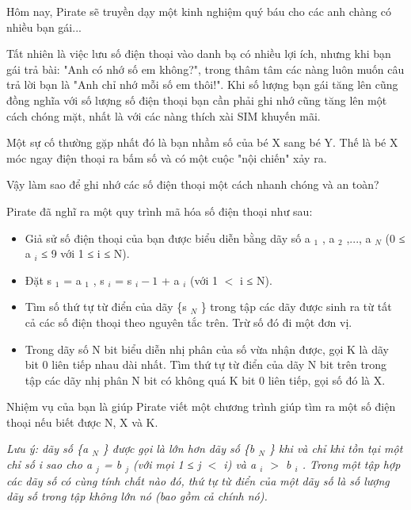



   Hôm nay, Pirate sẽ truyền dạy một kinh nghiệm quý báu cho các anh chàng có nhiều bạn gái...  

   Tất nhiên là việc lưu số điện thoại vào danh bạ có nhiều lợi ích, nhưng khi bạn gái trả bài: "Anh có nhớ số em không?", trong thâm tâm các nàng luôn muốn câu trả lời bạn là "Anh chỉ nhớ mỗi số em thôi!". Khi số lượng bạn gái tăng lên cũng đồng nghĩa với số lượng số điện thoại bạn cần phải ghi nhớ cũng tăng lên một cách chóng mặt, nhất là với các nàng thích xài SIM khuyến mãi.  

   Một sự cố thường gặp nhất đó là bạn nhầm số của bé X sang bé Y. Thế là bé X móc ngay điện thoại ra bấm số và có một cuộc "nội chiến" xảy ra.  

    Vậy làm sao để ghi nhớ các số điện thoại một cách nhanh chóng và an toàn?   

   Pirate đã nghĩ ra một quy trình mã hóa số điện thoại như sau:  
\begin{itemize}
	\item     Giả sử số điện thoại của bạn được biểu diễn bằng dãy số a    $_     1    $    , a    $_     2    $    ,..., a    $_     N    $    (0 ≤ a    $_     i    $    ≤ 9 với 1 ≤ i ≤ N).   
	\item     Đặt s    $_     1    $    = a    $_     1    $    , s    $_     i    $    = s    $_     i - 1    $    + a    $_     i    $    (với 1 $<$ i ≤ N).   
	\item     Tìm số thứ tự từ điển của dãy \{s    $_     N    $    \} trong tập các dãy được sinh ra từ tất cả các số điện thoại theo nguyên tắc trên. Trừ số đó đi một đơn vị.   
	\item     Trong dãy số N bit biểu diễn nhị phân của số vừa nhận được, gọi K là dãy bit 0 liên tiếp nhau dài nhất. Tìm thứ tự từ điển của dãy N bit trên trong tập các dãy nhị phân N bit có không quá K bit 0 liên tiếp, gọi số đó là X.   
\end{itemize}

   Nhiệm vụ của bạn là giúp Pirate viết một chương trình giúp tìm ra một số điện thoại nếu biết được N, X và K.  

\emph{    Lưu ý: dãy số \{a    $_     N    $    \} được gọi là lớn hơn dãy số \{b    $_     N    $    \} khi và chỉ khi tồn tại một chỉ số i sao cho a    $_     j    $    = b    $_     j    $    (với mọi 1 ≤ j $<$ i) và a    $_     i    $    $>$ b    $_     i    $    . Trong một tập hợp các dãy số có cùng tính chất nào đó, thứ tự từ điển của một dãy số là số lượng dãy số trong tập không lớn nó (bao gồm cả chính nó).   }



